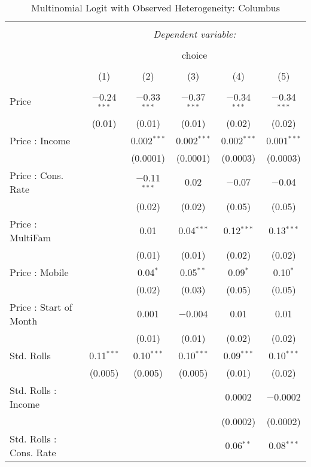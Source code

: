 
\begin{table}[!htbp] \centering 
  \caption{Multinomial Logit with Observed Heterogeneity: Columbus} 
  \label{tab:mnlColumbusObsHet} 
\begin{tabular}{@{\extracolsep{5pt}}lccccc} 
\\[-1.8ex]\hline 
\hline \\[-1.8ex] 
 & \multicolumn{5}{c}{\textit{Dependent variable:}} \\ 
\cline{2-6} 
\\[-1.8ex] & \multicolumn{5}{c}{choice} \\ 
\\[-1.8ex] & (1) & (2) & (3) & (4) & (5)\\ 
\hline \\[-1.8ex] 
 Price & $-$0.24$^{***}$ & $-$0.33$^{***}$ & $-$0.37$^{***}$ & $-$0.34$^{***}$ & $-$0.34$^{***}$ \\ 
  & (0.01) & (0.01) & (0.01) & (0.02) & (0.02) \\ 
  Price : Income &  & 0.002$^{***}$ & 0.002$^{***}$ & 0.002$^{***}$ & 0.001$^{***}$ \\ 
  &  & (0.0001) & (0.0001) & (0.0003) & (0.0003) \\ 
  Price : Cons. Rate &  & $-$0.11$^{***}$ & 0.02 & $-$0.07 & $-$0.04 \\ 
  &  & (0.02) & (0.02) & (0.05) & (0.05) \\ 
  Price : MultiFam &  & 0.01 & 0.04$^{***}$ & 0.12$^{***}$ & 0.13$^{***}$ \\ 
  &  & (0.01) & (0.01) & (0.02) & (0.02) \\ 
  Price : Mobile &  & 0.04$^{*}$ & 0.05$^{**}$ & 0.09$^{*}$ & 0.10$^{*}$ \\ 
  &  & (0.02) & (0.03) & (0.05) & (0.05) \\ 
  Price : Start of Month &  & 0.001 & $-$0.004 & 0.01 & 0.01 \\ 
  &  & (0.01) & (0.01) & (0.02) & (0.02) \\ 
  Std. Rolls & 0.11$^{***}$ & 0.10$^{***}$ & 0.10$^{***}$ & 0.09$^{***}$ & 0.10$^{***}$ \\ 
  & (0.005) & (0.005) & (0.005) & (0.01) & (0.02) \\ 
  Std. Rolls : Income &  &  &  & 0.0002 & $-$0.0002 \\ 
  &  &  &  & (0.0002) & (0.0002) \\ 
  Std. Rolls : Cons. Rate &  &  &  & 0.06$^{**}$ & 0.08$^{***}$ \\ 

\end{tabular}
\end{table}
